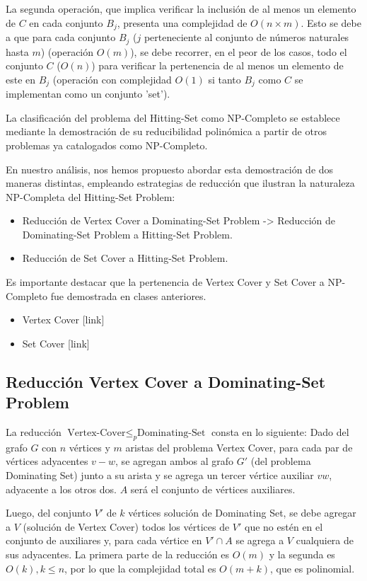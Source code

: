 La segunda operación, que implica verificar la inclusión de al menos un elemento de $C$ 
en cada conjunto $B_{j}$, presenta una complejidad de $O(n \times m)$. Esto se debe a 
que para cada conjunto $B_{j}$ ($j$ perteneciente al conjunto de números naturales hasta 
$m$) (operación $O(m)$), se debe recorrer, en el peor de los casos, todo el conjunto $C$ 
($O(n)$) para verificar la pertenencia de al menos un elemento de este en $B_{j}$ 
(operación con complejidad $O(1)$ si tanto $B_{j}$ como $C$ se implementan como un conjunto 'set').

La clasificación del problema del Hitting-Set como NP-Completo se establece mediante la demostración
de su reducibilidad polinómica a partir de otros problemas ya catalogados como NP-Completo. 

En nuestro análisis, nos hemos propuesto abordar esta demostración de dos maneras distintas, 
empleando estrategias de reducción que ilustran la naturaleza NP-Completa del Hitting-Set Problem:

\begin{itemize}
    \item Reducción de Vertex Cover a Dominating-Set Problem -> Reducción de Dominating-Set Problem a Hitting-Set Problem.
    \item Reducción de Set Cover a Hitting-Set Problem.
\end{itemize}


Es importante destacar que la pertenencia de Vertex Cover y Set Cover a NP-Completo fue demostrada en clases anteriores.
\begin{itemize}
    \item  Vertex Cover [link]
    \item Set Cover [link]
\end{itemize}


\subsection{Reducción Vertex Cover a Dominating-Set Problem}

La reducción $\text{Vertex-Cover} \leq _{p} \text{Dominating-Set}$ consta en lo siguiente:
Dado del grafo $G$ con $n$ vértices y $m$ aristas del problema Vertex Cover, para cada par de 
vértices adyacentes $v-w$, se agregan ambos al grafo $G'$ (del problema Dominating Set) junto a 
su arista y se agrega un tercer vértice auxiliar $vw$, adyacente a los otros dos. $A$ será el 
conjunto de vértices auxiliares. 

Luego, del conjunto $V'$ de $k$ vértices solución de Dominating Set, se debe agregar a $V$ (solución de Vertex Cover) todos los vértices de $V'$ que no estén en el conjunto de auxiliares y, para cada vértice en $V' \cap A$ se agrega a $V$  cualquiera de sus adyacentes. La primera parte de la reducción es $O(m)$ y la segunda es $O(k),k \leq n$, por lo que la complejidad total es $O(m+k)$, que es polinomial.

